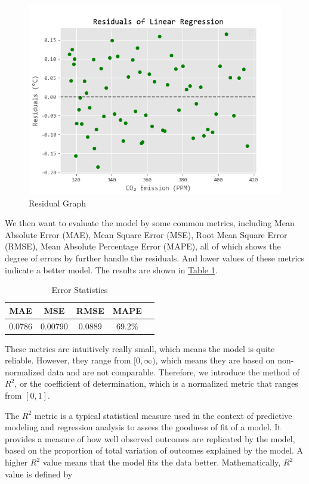 \documentclass[12pt,a4paper]{article}
\begin{document}
    \begin{figure}[htbp]
        \centering
        \includegraphics[width=0.5\linewidth]{img/residual.png}
        \caption{Residual Graph}
        \label{residual}
    \end{figure}

    We then want to evaluate the model by some common metrics, including Mean Absolute Error (MAE), Mean Square Error (MSE), Root Mean Square Error (RMSE), Mean Absolute Percentage Error (MAPE), all of which shows the degree of errors by further handle the residuals. And lower values of these metrics indicate a better model. The results are shown in \hyperref[errorsta]{Table \ref*{errorsta}}.

    \begin{table}[htbp]
    \renewcommand*{\arraystretch}{1.3}
    \centering
    \caption{Error Statistics}
    \begin{tabular}{ccccc}
        \toprule[2pt]
        MAE&MSE&RMSE&MAPE\\
        \midrule
        0.0786&0.00790&0.0889&69.2\%\\
        \bottomrule[2pt]
    \end{tabular}
    \label{errorsta}
    \end{table}

    These metrics are intuitively really small, which means the model is quite reliable. However, they range from $[0,\infty)$, which means they are based on non-normalized data and are not comparable. Therefore, we introduce the method of $R^2$, or the coefficient of determination, which is a normalized metric that ranges from $[0,1]$. 

    The $R^2$ metric is a typical statistical measure used in the context of predictive modeling and regression analysis to assess the goodness of fit of a model. It provides a measure of how well observed outcomes are replicated by the model, based on the proportion of total variation of outcomes explained by the model. A higher $R^2$ value means that the model fits the data better. Mathematically, $R^2$ value is defined by
    
\end{document}
